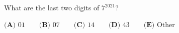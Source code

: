 What are the last two digits of $7^{2021}$?

$\textbf{(A) }01\qquad\textbf{(B) }07\qquad\textbf{(C) }14\qquad\textbf{(D) }43\qquad\textbf{(E) }\text{Other}$
